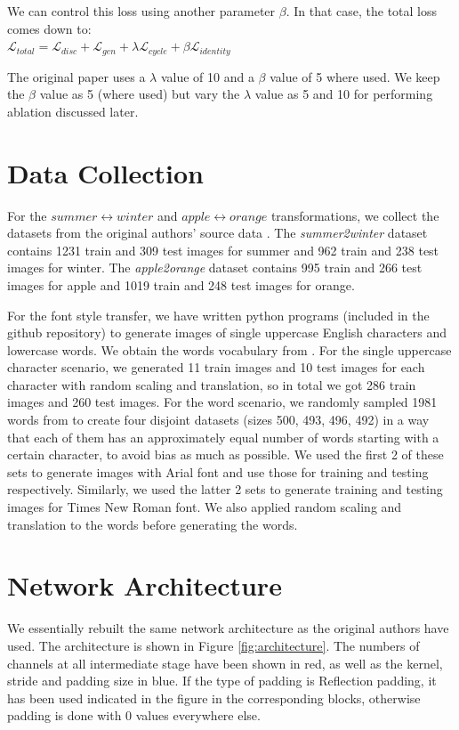 \documentclass[10pt,twocolumn,letterpaper]{article}
\begin{document}
We can control this loss using another parameter $\beta$. In that case, the total loss comes down to:\\

$\mathcal{L}_{total} = \mathcal{L}_{disc} + \mathcal{L}_{gen} + \lambda\mathcal{L}_{cycle} + \beta\mathcal{L}_{identity}$

The original paper uses a $\lambda$ value of 10 and a $\beta$ value of 5 where used.
We keep the $\beta$ value as 5 (where used) but vary the $\lambda$ value as 5 and 10 for performing ablation discussed later.

\section{Data Collection}

For the $summer \leftrightarrow winter$ and $apple \leftrightarrow orange$ transformations, we collect 
the datasets from the original authors' source data \cite{data1}. The \textit{summer2winter} dataset contains 1231 train and 309 test images for summer and 962 train and 238 test images for winter. The \textit{apple2orange} dataset contains 995 train and 266 test images for apple and 1019 train and 248 test images for orange.

For the font style transfer, we have written python programs (included in the github repository) to generate images of single uppercase English characters and lowercase words. We obtain the words vocabulary from \cite{data2}. For the single uppercase character scenario, we generated 11 train images and 10 test images for each character with random scaling and translation, so in total we got 286 train images and 260 test images. For the word scenario, we randomly sampled 1981 words from \cite{data2} to create four disjoint datasets (sizes 500, 493, 496, 492) in a way that each of them has an approximately equal number of words starting with a certain character, to avoid bias as much as possible. We used the first 2 of these sets to generate images with Arial font and use those for training and testing respectively. Similarly, we used the latter 2 sets to generate training and testing images for Times New Roman font. We also applied random scaling and translation to the words before generating the words. 

\section{Network Architecture}
We essentially rebuilt the same network architecture as the original authors 
\cite{cyclegan} have used. The architecture is shown in Figure \ref{fig:architecture}. 
The numbers of channels at all intermediate stage have been shown in red, as well as 
the kernel, stride and padding size in blue. If the type of padding is Reflection 
padding, it has been used indicated in the figure in the corresponding blocks, 
otherwise padding is done with 0 values everywhere else. 
\end{document}

